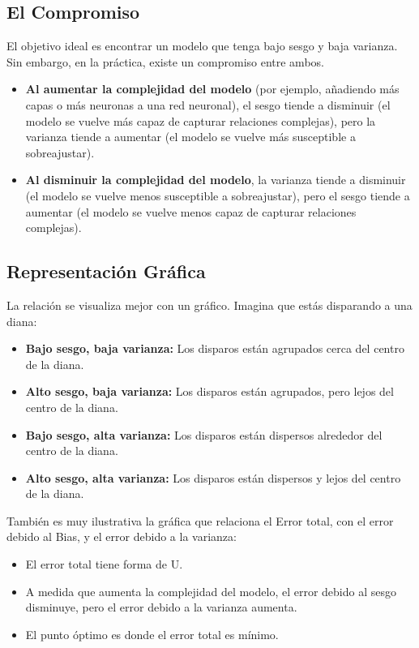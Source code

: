 \documentclass{article}
\begin{document}
\subsection{El Compromiso}

El objetivo ideal es encontrar un modelo que tenga bajo sesgo y baja varianza. Sin embargo, en la práctica, existe un compromiso entre ambos.

\begin{itemize}
    \item \textbf{Al aumentar la complejidad del modelo} (por ejemplo, añadiendo más capas o más neuronas a una red neuronal), el sesgo tiende a disminuir (el modelo se vuelve más capaz de capturar relaciones complejas), pero la varianza tiende a aumentar (el modelo se vuelve más susceptible a sobreajustar).
    \item \textbf{Al disminuir la complejidad del modelo}, la varianza tiende a disminuir (el modelo se vuelve menos susceptible a sobreajustar), pero el sesgo tiende a aumentar (el modelo se vuelve menos capaz de capturar relaciones complejas).
\end{itemize}

\subsection{Representación Gráfica}
La relación se visualiza mejor con un gráfico.
Imagina que estás disparando a una diana:
\begin{itemize}
    \item \textbf{Bajo sesgo, baja varianza:} Los disparos están agrupados cerca del centro de la diana.
    \item \textbf{Alto sesgo, baja varianza:} Los disparos están agrupados, pero lejos del centro de la diana.
     \item \textbf{Bajo sesgo, alta varianza:} Los disparos están dispersos alrededor del centro de la diana.
    \item \textbf{Alto sesgo, alta varianza:} Los disparos están dispersos y lejos del centro de la diana.
\end{itemize}

También es muy ilustrativa la gráfica que relaciona el Error total, con el error debido al Bias, y el error debido a la varianza:
\begin{itemize}
   \item El error total tiene forma de U.
    \item A medida que aumenta la complejidad del modelo, el error debido al sesgo disminuye, pero el error debido a la varianza aumenta.
    \item El punto óptimo es donde el error total es mínimo.
\end{itemize}
\end{document}

